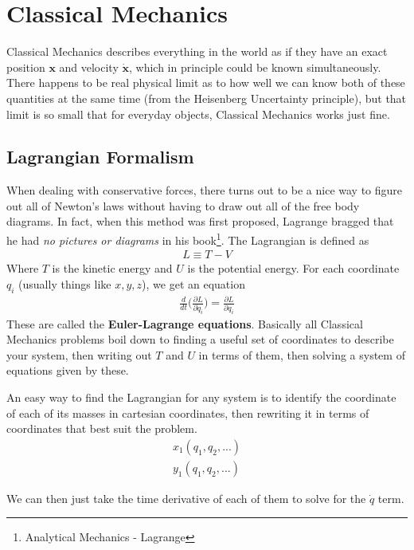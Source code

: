 \chapter{Classical Mechanics}

Classical Mechanics describes everything in the world as if they have an exact position $\textbf{x}$ and velocity $\dot{\textbf{x}}$, which in principle could be known simultaneously. There happens to be real physical limit as to how well we can know both of these quantities at the same time (from the Heisenberg Uncertainty principle), but that limit is so small that for everyday objects, Classical Mechanics works just fine.


\section{Lagrangian Formalism}
When dealing with conservative forces, there turns out to be a nice way to figure out all of Newton's laws without having to draw out all of the free body diagrams. In fact, when this method was first proposed, Lagrange bragged that he had \emph{no pictures or diagrams} in his book\footnote{Analytical Mechanics - Lagrange}. The Lagrangian is defined as 
\begin{align}
L\equiv T-V
\end{align}
Where $T$ is the kinetic energy and $U$ is the potential energy. For each coordinate $q_i$ (usually things like $x,y,z$), we get an equation 
\begin{align}
\boxed{\frac{d}{dt}\Big(\frac{\partial L}{\partial \dot{q}_i}\Big) = \frac{\partial L}{\partial q_i} }
\end{align}
These are called the \textbf{Euler-Lagrange equations}. Basically all Classical Mechanics problems boil down to finding a useful set of coordinates to describe your system, then writing out $T$ and $U$ in terms of them, then solving a system of equations given by these.


     An easy way to find the Lagrangian for any system is to identify the coordinate of each of its masses in cartesian coordinates, then rewriting it in terms of coordinates that best suit the problem. 
     \begin{align}
        x_1(q_1,q_2,...)\\
        y_1(q_1,q_2,...)
     \end{align}
     
     We can then just take the time derivative of each of them to solve for the $\dot{q}$ term.





